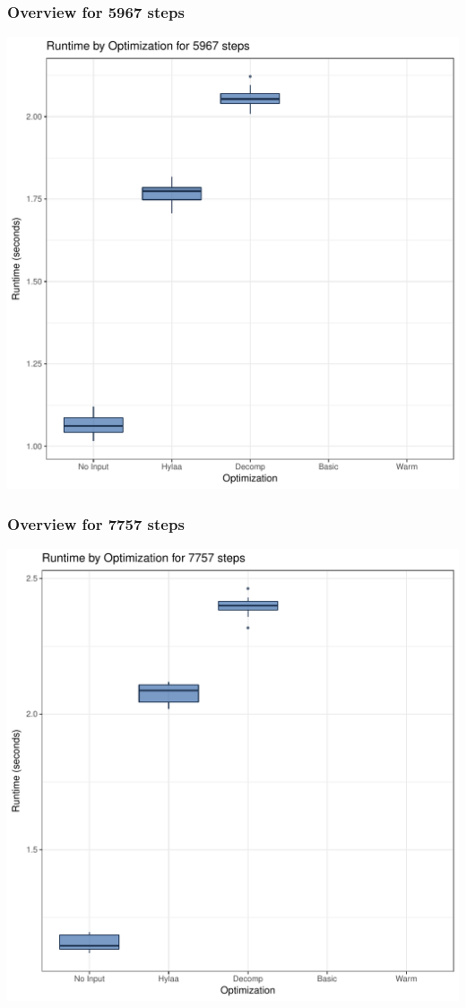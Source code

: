 \documentclass{article}\usepackage[]{graphicx}\usepackage[]{color}
\makeatletter
\def\maxwidth{ %
  \ifdim\Gin@nat@width>\linewidth
    \linewidth
  \else
    \Gin@nat@width
  \fi
}
\newenvironment{knitrout}{}{} %
\makeatother
\begin{document}
\subsubsection{Overview for 5967 steps}
\begin{knitrout}
\color{fgcolor}
\includegraphics[width=\maxwidth]{figure/steps5967-1} 

\end{knitrout}
\subsubsection{Overview for 7757 steps}
\begin{knitrout}
\color{fgcolor}
\includegraphics[width=\maxwidth]{figure/steps7757-1} 

\end{knitrout}
\end{document}
